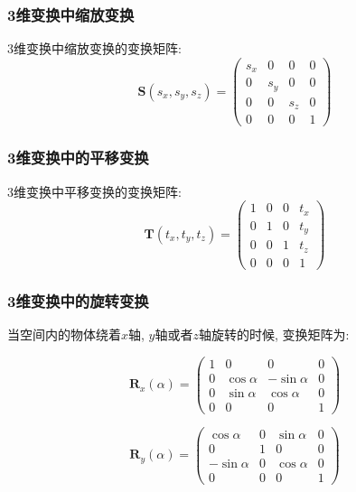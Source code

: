 \subsubsection{3维变换中缩放变换}
3维变换中缩放变换的变换矩阵: 
\begin{equation}
	\textbf{S}(s_x,s_y,s_z)=\begin{pmatrix}s_x&0&0&0\\0&s_y&0&0\\0&0&s_z&0\\0&0&0&1\end{pmatrix}
\end{equation}

\subsubsection{3维变换中的平移变换}
3维变换中平移变换的变换矩阵: 
\begin{equation}
	\textbf{T}(t_x,t_y,t_z)=\begin{pmatrix}1&0&0&t_x\\0&1&0&t_y\\0&0&1&t_z\\0&0&0&1\end{pmatrix}
\end{equation}

\subsubsection{3维变换中的旋转变换}

当空间内的物体绕着$x$轴, $y$轴或者$z$轴旋转的时候, 变换矩阵为: 

\begin{equation}
\textbf{R}_x(\alpha)=\begin{pmatrix}1&0&0&0\\0&\cos\alpha&-\sin\alpha&0\\0&\sin\alpha&\cos\alpha&0\\0&0&0&1\end{pmatrix}
\end{equation}

\begin{equation}
	\textbf{R}_y(\alpha)=\begin{pmatrix}\cos\alpha&0&\sin\alpha&0\\0&1&0&0\\-\sin\alpha&0&\cos\alpha&0\\0&0&0&1\end{pmatrix}
\end{equation}

